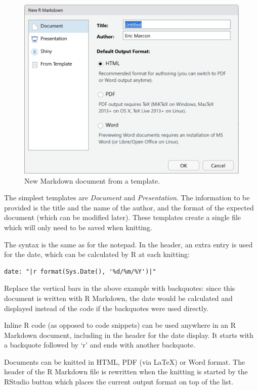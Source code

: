 \documentclass[
  12pt,
  american,
  a4paper,
  extrafontsizes,onecolumn,openright
  ]{memoir}
\begin{document}
\scriptsize

\begin{figure}

{\centering \includegraphics[width=0.8\linewidth]{images/e-rmd1} 

}

\caption{New Markdown document from a template.}\label{fig:e-rmd1}
\end{figure}

\normalsize

The simplest templates are \emph{Document} and \emph{Presentation}.
The information to be provided is the title and the name of the author, and the format of the expected document (which can be modified later).
These templates create a single file which will only need to be saved when knitting.

The syntax is the same as for the notepad.
In the header, an extra entry is used for the date, which can be calculated by R at each knitting:

\begin{verbatim}
date: "|r format(Sys.Date(), '%d/%m/%Y')|"
\end{verbatim}

Replace the vertical bars \texttt{\textbar{}} in the above example with backquotes: since this document is written with R Markdown, the date would be calculated and displayed instead of the code if the backquotes were used directly.

Inline R code (as opposed to code snippets) can be used anywhere in an R Markdown document, including in the header for the date display.
It starts with a backquote followed by `r' and ends with another backquote.

Documents can be knitted in HTML, PDF (via LaTeX) or Word format.
The header of the R Markdown file is rewritten when the knitting is started by the RStudio button which places the current output format on top of the list.
\end{document}
